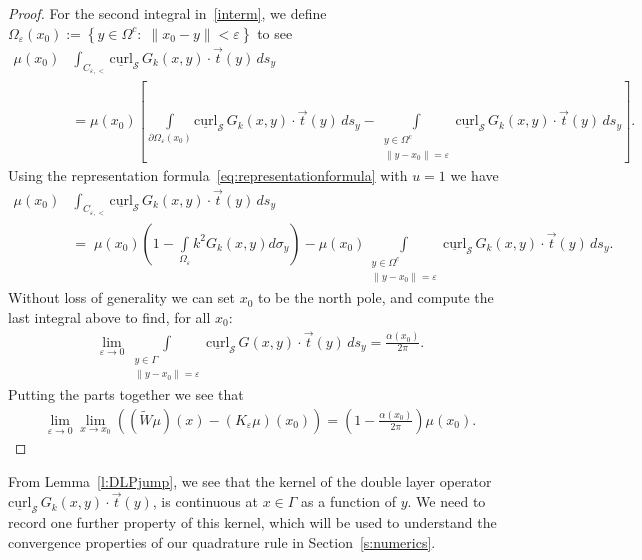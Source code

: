 \documentclass[final]{siamltex}
\renewcommand{\S} {\mathcal{S}}
\newcommand{\e}{\varepsilon}
\begin{document}
\begin{proof}
For the second integral in~\eqref{interm}, we define
$\Omega_{\varepsilon}(x_{0}):=\left\{ y\in\Omega^{c}:\; \|x_0-y\|<
\varepsilon \right\}$ to see
\begin{align*}
  \mu(x_0)&\int_{C_{\e,<}} \underline{\mbox{curl}}_{\S}\,
    G_k(x,y)\cdot\vec{t}(y)\,ds_{y} \\
  &= \mu(x_0) \left[ \int\limits_{\partial \Omega_{\varepsilon}(x_0)} 
  \underline{\mbox{curl}}_{\S}\,G_k(x,y)\cdot\vec{t}(y)\,ds_{y} - 
  \int\limits_{\substack{y \in \Omega^{c} \\ \|y - x_{0}\| =
  \varepsilon}}
\underline{\mbox{curl}}_{\S}\,G_k(x,y)\cdot\vec{t}(y)\,ds_{y} \right].
\end{align*}
Using the representation formula~\eqref{eq:representationformula} with
$u=1$ we have
\begin{align*}
  \mu(x_0)&\int_{C_{\e,<}} \underline{\mbox{curl}}_{\S}\,
    G_k(x,y)\cdot\vec{t}(y)\,ds_{y} \\
    &=\;\mu(x_0) \left(1 - \int\limits_{\Omega_{\varepsilon}} 
    k^2 G_k(x,y) d\sigma_{y}\right) 
   - \mu(x_0) \int\limits_{\substack{y \in \Omega^{c} \\ \|y - x_{0}\| =
  \varepsilon}}
\underline{\mbox{curl}}_{\S}\,G_k(x,y)\cdot\vec{t}(y)\,ds_{y}.
\end{align*}
Without loss of generality we can set $x_0$ to be the north pole, and
compute the last integral above  to find, for all $x_{0}$: 
\begin{align*}
  \lim_{\varepsilon\rightarrow 0}
  \int\limits_{\substack{y \in \Gamma \\ \|y - x_{0}\| = \varepsilon}}
  \underline{\mbox{curl}}_{\S}\,G(x,y)\cdot\vec{t}(y)\,ds_{y}
  =\frac{\alpha(x_0)}{2\pi}.
\end{align*}
Putting the parts together we see that
\begin{align*}
  \lim_{\varepsilon\rightarrow 0} \lim_{x\rightarrow x_0}
  \left((\widetilde{W}\mu)(x)-(K_{\varepsilon}\mu)(x_0)\right)
  =\left(1-\frac{\alpha(x_0)}{2\pi}\right)\mu(x_0).
\end{align*}
\end{proof}

From Lemma~\ref{l:DLPjump}, we see that the kernel of the double layer
operator $\underline{\mbox{curl}}_{\S}\, G_{k}(x,y)\cdot\vec{t}(y)$, is
continuous at $x \in \Gamma$ as a function of $y$.  We need to record
one further property of this kernel, which will be used to understand
the convergence properties of our quadrature rule in
Section~\ref{s:numerics}.
\end{document}
